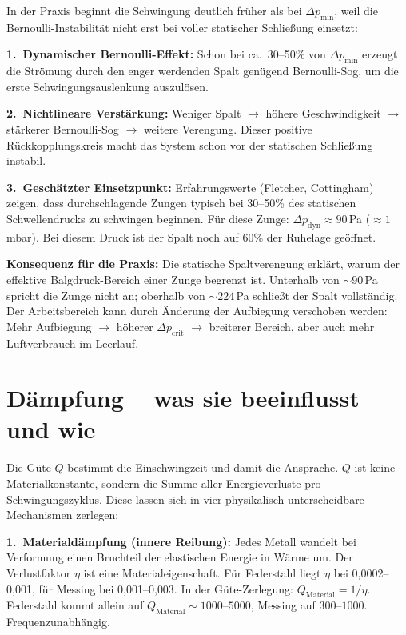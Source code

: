 \documentclass[11pt,a4paper]{article}
\begin{document}
In der Praxis beginnt die Schwingung deutlich früher als bei $\Delta p_\text{min}$, weil die Bernoulli-Instabilität nicht erst bei voller statischer Schließung einsetzt:

\textbf{1.\ Dynamischer Bernoulli-Effekt:} Schon bei ca.\ 30--50\% von $\Delta p_\text{min}$ erzeugt die Strömung durch den enger werdenden Spalt genügend Bernoulli-Sog, um die erste Schwingungsauslenkung auszulösen.

\textbf{2.\ Nichtlineare Verstärkung:} Weniger Spalt $\to$ höhere Geschwindigkeit $\to$ stärkerer Bernoulli-Sog $\to$ weitere Verengung. Dieser positive Rückkopplungskreis macht das System schon vor der statischen Schließung instabil.

\textbf{3.\ Geschätzter Einsetzpunkt:} Erfahrungswerte (Fletcher, Cottingham) zeigen, dass durchschlagende Zungen typisch bei 30--50\% des statischen Schwellendrucks zu schwingen beginnen. Für diese Zunge: $\Delta p_\text{dyn} \approx 90$\,Pa ($\approx 1$\,mbar). Bei diesem Druck ist der Spalt noch auf 60\% der Ruhelage geöffnet.

\begin{warnbox}
\textbf{Konsequenz für die Praxis:} Die statische Spaltverengung erklärt, warum der effektive Balgdruck-Bereich einer Zunge begrenzt ist. Unterhalb von $\sim 90$\,Pa spricht die Zunge nicht an; oberhalb von $\sim 224$\,Pa schließt der Spalt vollständig. Der Arbeitsbereich kann durch Änderung der Aufbiegung verschoben werden: Mehr Aufbiegung $\to$ höherer $\Delta p_\text{crit}$ $\to$ breiterer Bereich, aber auch mehr Luftverbrauch im Leerlauf.
\end{warnbox}

\section{Dämpfung -- was sie beeinflusst und wie}

Die Güte $Q$ bestimmt die Einschwingzeit und damit die Ansprache. $Q$ ist keine Materialkonstante, sondern die Summe aller Energieverluste pro Schwingungszyklus. Diese lassen sich in vier physikalisch unterscheidbare Mechanismen zerlegen:

\textbf{1.\ Materialdämpfung (innere Reibung):} Jedes Metall wandelt bei Verformung einen Bruchteil der elastischen Energie in Wärme um. Der Verlustfaktor $\eta$ ist eine Materialeigenschaft. Für Federstahl liegt $\eta$ bei 0{,}0002--0{,}001, für Messing bei 0{,}001--0{,}003. In der Güte-Zerlegung: $Q_\text{Material} = 1/\eta$. Federstahl kommt allein auf $Q_\text{Material} \sim 1000$--$5000$, Messing auf $300$--$1000$. Frequenzunabhängig.
\end{document}
